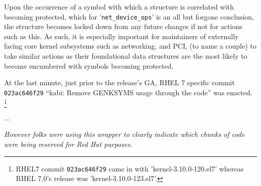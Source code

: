 \documentclass[10pt,oneside,english]{book}
\begin{document}
Upon the occurrence of a symbol with which a structure is correlated
with becoming protected, which for '\texttt{net\_device\_ops}' is
an all but forgone conclusion, the structure becomes locked down from
any future changes if not for actions such as this. As such, it is
especially important for maintainers of externally facing core kernel
subsystems such as networking, and PCI, (to name a couple) to take
similar actions as their foundational data structures are the most
likely to become encumbered with symbols becoming protected.


At the last minute, just prior to the release's GA, RHEL 7 specific
commit \texttt{023ac646f29} ``kabi: Remove GENKSYMS usage through
the code'' was enacted. \footnote{RHEL7 commit \texttt{023ac646f29} came in with 'kernel-3.10.0-120.el7'
whereas RHEL 7.0's release was 'kernel-3.10.0-123.el7'.}

\emph{...}

\emph{However folks were using this wrapper to clearly indicate which
chunks of code were being reserved for Red Hat purposes.}
\end{document}
